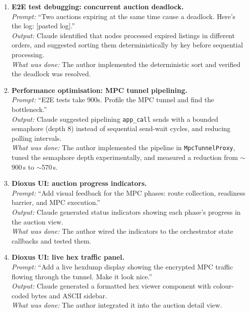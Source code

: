 \begin{enumerate}
  \item \textbf{E2E test debugging: concurrent auction deadlock.}\\
    \textit{Prompt:} ``Two auctions expiring at the same time cause a
    deadlock.  Here's the log: [pasted log].''\\
    \textit{Output:} Claude identified that nodes processed expired
    listings in different orders, and suggested sorting them
    deterministically by key before sequential processing.\\
    \textit{What was done:} The author implemented the deterministic
    sort and verified the deadlock was resolved.

  \item \textbf{Performance optimisation: MPC tunnel pipelining.}\\
    \textit{Prompt:} ``E2E tests take 900s.  Profile the MPC tunnel
    and find the bottleneck.''\\
    \textit{Output:} Claude suggested pipelining \texttt{app\_call}
    sends with a bounded semaphore (depth 8) instead of sequential
    send-wait cycles, and reducing polling intervals.\\
    \textit{What was done:} The author implemented the pipeline in
    \texttt{MpcTunnelProxy}, tuned the semaphore depth experimentally,
    and measured a reduction from ${\sim}$900\,s to ${\sim}$570\,s.

  \item \textbf{Dioxus UI: auction progress indicators.}\\
    \textit{Prompt:} ``Add visual feedback for the MPC phases: route
    collection, readiness barrier, and MPC execution.''\\
    \textit{Output:} Claude generated status indicators showing each
    phase's progress in the auction view.\\
    \textit{What was done:} The author wired the indicators to the
    orchestrator state callbacks and tested them.

  \item \textbf{Dioxus UI: live hex traffic panel.}\\
    \textit{Prompt:} ``Add a live hexdump display showing the encrypted
    MPC traffic flowing through the tunnel.  Make it look nice.''\\
    \textit{Output:} Claude generated a formatted hex viewer component
    with colour-coded bytes and ASCII sidebar.\\
    \textit{What was done:} The author integrated it into the auction
    detail view.


\end{enumerate}
